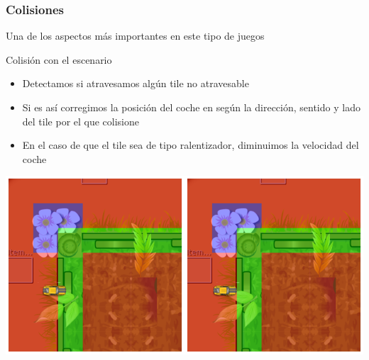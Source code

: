 \begin{frame}
    \frametitle{Colisiones}
    
    Una de los aspectos más importantes en este tipo de juegos
    \begin{block}{Colisión con el escenario}
        \begin{itemize}
            \item Detectamos si atravesamos algún tile no atravesable
            \item Si es así corregimos la posición del coche en según la dirección, sentido y lado del tile por
            el que colisione
            \item En el caso de que el tile sea de tipo ralentizador, diminuimos la velocidad del coche
        \end{itemize}
    \end{block}

    \begin{center}
        \includegraphics[scale=0.3]{imagenes/colision1-colision2.png}
    \end{center}
\end{frame}

